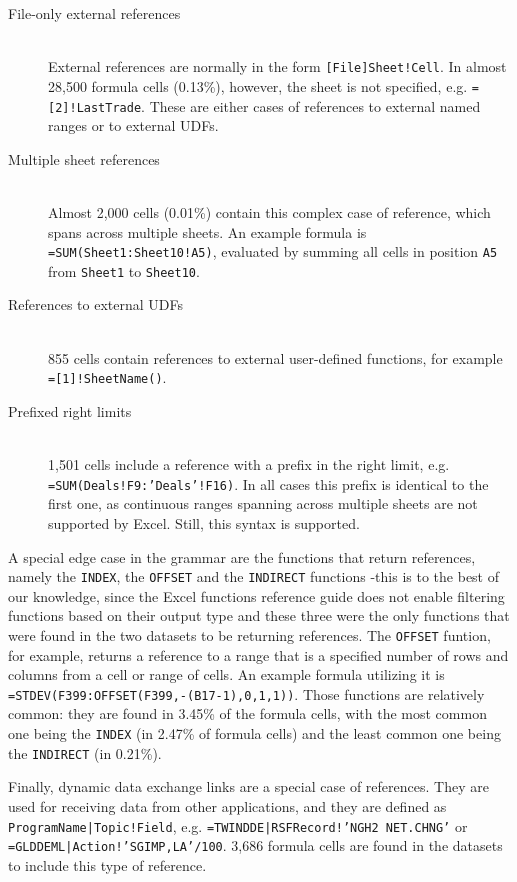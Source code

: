 \documentclass[conference]{IEEEtran}
\begin{document}
\begin{description}
	\item[File-only external references] \hfill \\
	External references are normally in the form \texttt{[File]Sheet!Cell}. In almost 28,500 formula cells (0.13\%), however, the sheet is not specified, e.g. \texttt{=[2]!LastTrade}. These are either cases of references to external named ranges or to external UDFs.
	\item[Multiple sheet references] \hfill \\
	Almost 2,000 cells (0.01\%) contain this complex case of reference, which spans across multiple sheets. An example formula is \texttt{=SUM(Sheet1:Sheet10!A5)}, evaluated by summing all cells in position \texttt{A5} from \texttt{Sheet1} to \texttt{Sheet10}.
	\item[References to external UDFs] \hfill \\
	855 cells contain references to external user-defined functions, for example \texttt{=[1]!SheetName()}.
	\item[Prefixed right limits] \hfill \\
	1,501 cells include a reference with a prefix in the right limit, e.g. \texttt{=SUM(Deals!F9:'Deals'!F16)}. In all cases this prefix is identical to the first one, as continuous ranges spanning across multiple sheets are not supported by Excel. Still, this syntax is supported.
\end{description}

A special edge case in the grammar are the functions that return references, namely the \texttt{INDEX}, the \texttt{OFFSET} and the \texttt{INDIRECT} functions -this is to the best of our knowledge, since the Excel functions reference guide does not enable filtering functions based on their output type and these three were the only functions that were found in the two datasets to be returning references. The \texttt{OFFSET} funtion, for example, returns a reference to a range that is a specified number of rows and columns from a cell or range of cells. An example formula utilizing it is \texttt{=STDEV(F399:OFFSET(F399,-(B17-1),0,1,1))}. Those functions are relatively common: they are found in 3.45\% of the formula cells, with the most common one being the \texttt{INDEX} (in 2.47\% of formula cells) and the least common one being the \texttt{INDIRECT} (in 0.21\%).

Finally, dynamic data exchange links are a special case of references. They are used for receiving data from other applications, and they are defined as \texttt{ProgramName|Topic!Field}, e.g. \texttt{=TWINDDE|RSFRecord!'NGH2 NET.CHNG'} or \texttt{=GLDDEML|Action!'SGIMP,LA'/100}. 3,686 formula cells are found in the datasets to include this type of reference.
\end{document}
